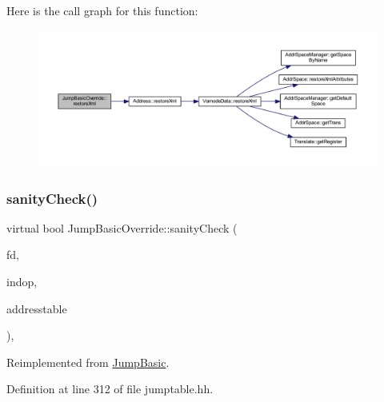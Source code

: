 Here is the call graph for this function\+:
\nopagebreak
\begin{figure}[H]
\begin{center}
\leavevmode
\includegraphics[width=350pt]{class_jump_basic_override_afc4f40d7eaff7e5a25804dc57323b9db_cgraph}
\end{center}
\end{figure}
\mbox{\label{class_jump_basic_override_a050d3faa295ff61d04f1406443ac83b1}} 
\subsubsection{\texorpdfstring{sanityCheck()}{sanityCheck()}}
{\footnotesize\ttfamily virtual bool Jump\+Basic\+Override\+::sanity\+Check (\begin{DoxyParamCaption}\item[{\mbox{\hyperlink{class_funcdata}{Funcdata}} $\ast$}]{fd,  }\item[{\mbox{\hyperlink{class_pcode_op}{Pcode\+Op}} $\ast$}]{indop,  }\item[{vector$<$ \mbox{\hyperlink{class_address}{Address}} $>$ \&}]{addresstable }\end{DoxyParamCaption})\hspace{0.3cm}{\ttfamily [inline]}, {\ttfamily [virtual]}}



Reimplemented from \mbox{\hyperlink{class_jump_basic_a1cba6b6c963e4a70efc439c27e53bd44}{Jump\+Basic}}.



Definition at line 312 of file jumptable.\+hh.

\mbox{\label{class_jump_basic_override_a62070a61c5ab32dbc287c7b32e74bd64}} 
